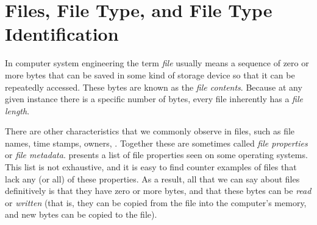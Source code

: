 \chapter{Files, File Type, and File Type Identification}

In computer system engineering the term \emph{file} usually means a
sequence of zero or more bytes that can be saved in some kind of storage
device so that it can be repeatedly accessed. These bytes are known as the \emph{file contents}. 
Because at any given instance there is a specific number of bytes, every file inherently has a
\emph{file length}. 

There are other characteristics that we
commonly observe in files, such as file names, time stamps, owners,
\etc. Together these are sometimes called \emph{file
  properties} or \emph{file metadata}. 
presents a list of file
properties seen on some operating systems. This list is not
exhaustive, and it is easy to find counter examples of files that lack any
(or all) of these properties. As a result, all that we
can say about files definitively is that they have zero or more bytes,
and that these bytes can be \emph{read} or \emph{written} (that is, they can be
copied from the file into the computer's memory, and new bytes can be
copied to the file). 


